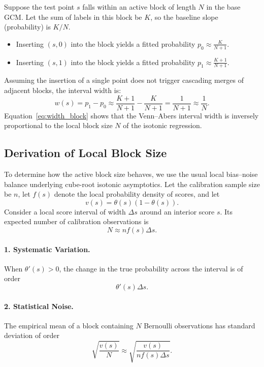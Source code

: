 \documentclass[11pt]{article}
\begin{document}
	Suppose the test point $s$ falls within an active block of length $N$ in the base GCM. Let the sum of labels in this block be $K$, so the baseline slope (probability) is $K/N$.
	\begin{itemize}
		\item Inserting $(s, 0)$ into the block yields a fitted probability $p_0 \approx \frac{K}{N+1}$.
		\item Inserting $(s, 1)$ into the block yields a fitted probability $p_1 \approx \frac{K+1}{N+1}$.
	\end{itemize}
	Assuming the insertion of a single point does not trigger cascading merges of adjacent blocks, the interval width is:
	\begin{equation}
		w(s) = p_1 - p_0 \approx \frac{K+1}{N+1} - \frac{K}{N+1} = \frac{1}{N+1} \approx \frac{1}{N}.
		\label{eq:width_block}
	\end{equation}
	Equation~\ref{eq:width_block} shows that the Venn--Abers interval width is inversely proportional to the local block size $N$ of the isotonic regression.
	
	\subsection{Derivation of Local Block Size}
	
	To determine how the active block size behaves, we use the usual local bias--noise balance underlying cube-root isotonic asymptotics. Let the calibration sample size be $n$, let $f(s)$ denote the local probability density of scores, and let
	\begin{equation}
		v(s)=\theta(s)(1-\theta(s)).
	\end{equation}
	Consider a local score interval of width $\Delta s$ around an interior score $s$. Its expected number of calibration observations is
	\begin{equation}
		N \approx n f(s)\Delta s.
		\label{eq:block_count_n}
	\end{equation}
	
	\paragraph{1. Systematic Variation.}
	When $\theta'(s)>0$, the change in the true probability across the interval is of order
	\begin{equation}
		\theta'(s)\Delta s.
	\end{equation}
	
	\paragraph{2. Statistical Noise.}
	The empirical mean of a block containing $N$ Bernoulli observations has standard deviation of order
	\begin{equation}
		\sqrt{\frac{v(s)}{N}}
		\approx
		\sqrt{\frac{v(s)}{n f(s)\Delta s}}.
	\end{equation}
	
\end{document}
